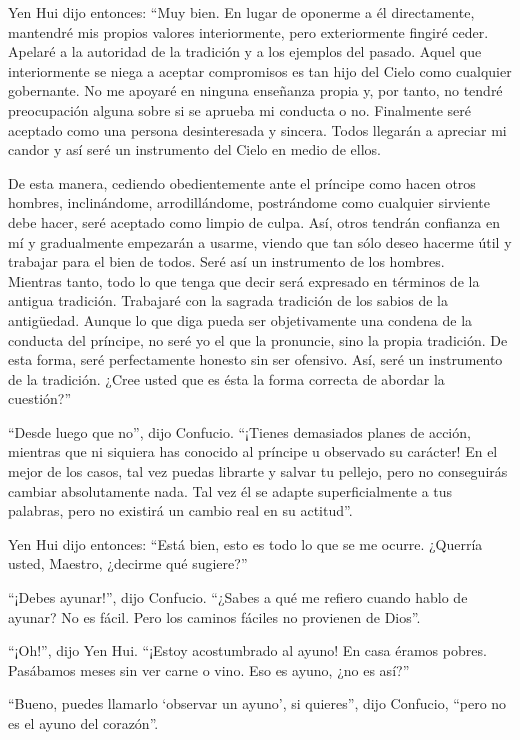 \documentclass[book,b5paper,hidelinks,final]{memoir}
\begin{document}
	Yen Hui dijo entonces: ``Muy bien. En lugar de oponerme a él
	directamente, mantendré mis propios valores interiormente, pero
	exteriormente fingiré ceder. Apelaré a la autoridad de la tradición y a
	los ejemplos del pasado. Aquel que interiormente se niega a aceptar
	compromisos es tan hijo del Cielo como cualquier gobernante. No me
	apoyaré en ninguna enseñanza propia y, por tanto, no tendré preocupación
	alguna sobre si se aprueba mi conducta o no. Finalmente seré aceptado
	como una persona desinteresada y sincera. Todos llegarán a apreciar mi
	candor y así seré un instrumento del Cielo en medio de ellos.
	
	De esta manera, cediendo obedientemente ante el príncipe como hacen
	otros hombres, inclinándome, arrodillándome, postrándome como cualquier
	sirviente debe hacer, seré aceptado como limpio de culpa. Así, otros
	tendrán confianza en mí y gradualmente empezarán a usarme, viendo que
	tan sólo deseo hacerme útil y trabajar para el bien de todos. Seré así
	un instrumento de los hombres.\\
	Mientras tanto, todo lo que tenga que decir será expresado en términos
	de la antigua tradición. Trabajaré con la sagrada tradición de los
	sabios de la antigüedad. Aunque lo que diga pueda ser objetivamente una
	condena de la conducta del príncipe, no seré yo el que la pronuncie,
	sino la propia tradición. De esta forma, seré perfectamente honesto sin
	ser ofensivo. Así, seré un instrumento de la tradición. ¿Cree usted que
	es ésta la forma correcta de abordar la cuestión?''
	
	``Desde luego que no'', dijo Confucio. ``¡Tienes demasiados planes de
	acción, mientras que ni siquiera has conocido al príncipe u observado su
	carácter! En el mejor de los casos, tal vez puedas librarte y salvar tu
	pellejo, pero no conseguirás cambiar absolutamente nada. Tal vez él se
	adapte superficialmente a tus palabras, pero no existirá un cambio real
	en su actitud''.
	
	Yen Hui dijo entonces: ``Está bien, esto es todo lo que se me ocurre.
	¿Querría usted, Maestro, ¿decirme qué sugiere?''
	
	``¡Debes ayunar!'', dijo Confucio. ``¿Sabes a qué me refiero cuando
	hablo de ayunar? No es fácil. Pero los caminos fáciles no provienen de
	Dios''.
	
	``¡Oh!'', dijo Yen Hui. ``¡Estoy acostumbrado al ayuno! En casa éramos
	pobres. Pasábamos meses sin ver carne o vino. Eso es ayuno, ¿no es
	así?''
	
	``Bueno, puedes llamarlo `observar un ayuno', si quieres'', dijo
	Confucio, ``pero no es el ayuno del corazón''.
	
\end{document}
